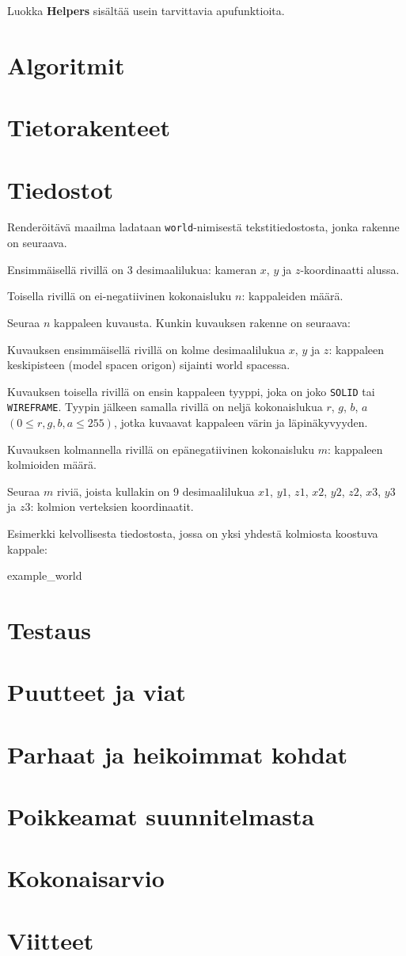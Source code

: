 \documentclass[12pt] {article}
\begin{document}
Luokka \textbf{Helpers} sisältää usein tarvittavia apufunktioita.

\section {Algoritmit}

\section {Tietorakenteet}

\section {Tiedostot}

Renderöitävä maailma ladataan \texttt{world}-nimisestä tekstitiedostosta, jonka rakenne on seuraava.

Ensimmäisellä rivillä on 3 desimaalilukua: kameran $x$, $y$ ja $z$-koordinaatti alussa.

Toisella rivillä on ei-negatiivinen kokonaisluku $n$: kappaleiden määrä.

Seuraa $n$ kappaleen kuvausta. Kunkin kuvauksen rakenne on seuraava:

Kuvauksen ensimmäisellä rivillä on kolme desimaalilukua $x$, $y$ ja $z$: kappaleen keskipisteen (model spacen origon) sijainti world spacessa.

Kuvauksen toisella rivillä on ensin kappaleen tyyppi, joka on joko \texttt{SOLID} tai \texttt{WIREFRAME}. Tyypin jälkeen samalla rivillä on neljä kokonaislukua $r$, $g$, $b$, $a$ $(0 \leq r, g, b, a \leq 255)$, jotka kuvaavat kappaleen värin ja läpinäkyvyyden.

Kuvauksen kolmannella rivillä on epänegatiivinen kokonaisluku $m$: kappaleen kolmioiden määrä.

Seuraa $m$ riviä, joista kullakin on 9 desimaalilukua $x1$, $y1$, $z1$, $x2$, $y2$, $z2$, $x3$, $y3$ ja $z3$: kolmion verteksien koordinaatit.

Esimerkki kelvollisesta tiedostosta, jossa on yksi yhdestä kolmiosta koostuva kappale:

 {example_world}

\section {Testaus}

\section {Puutteet ja viat}

\section {Parhaat ja heikoimmat kohdat}

\section {Poikkeamat suunnitelmasta}

\section {Kokonaisarvio}

\section {Viitteet}
\end{document}
